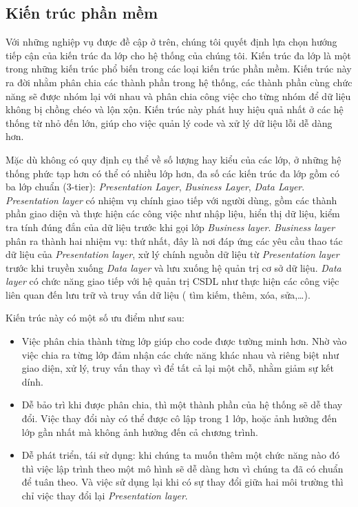 \subsection{Kiến trúc phần mềm}
Với những nghiệp vụ được đề cập ở trên, chúng tôi quyết định lựa chọn hướng tiếp cận của kiến trúc đa lớp cho hệ thống của chúng tôi. Kiến trúc đa lớp là một trong những kiến trúc phổ biến trong các loại kiến trúc phần mềm. Kiến trúc này ra đời nhằm phân chia các thành phần trong hệ thống, các thành phần cùng chức năng sẽ được nhóm lại với nhau và phân chia công việc cho từng nhóm để dữ liệu không bị chồng chéo và lộn xộn. Kiến trúc này phát huy hiệu quả nhất ở các hệ thống từ nhỏ đến lớn, giúp cho việc quản lý code và xử lý dữ liệu lỗi dễ dàng hơn.
\par
Mặc dù không có quy định cụ thể về số lượng hay kiểu của các lớp, ở những hệ thống phức tạp hơn có thể có nhiều lớp hơn, đa số các kiến trúc đa lớp gồm có ba lớp chuẩn (3-tier): \emph{Presentation Layer}, \emph{Business Layer}, \emph{Data Layer}. \emph{Presentation layer} có nhiệm vụ chính giao tiếp với người dùng, gồm các thành phần giao diện và thực hiện các công việc như nhập liệu, hiển thị dữ liệu, kiểm tra tính đúng đắn của dữ liệu trước khi gọi lớp \emph{Business layer}. \emph{Business layer} phân ra thành hai nhiệm vụ: thứ nhất, đây là nơi đáp ứng các yêu cầu thao tác dữ liệu của \emph{Presentation layer}, xử lý chính nguồn dữ liệu từ \emph{Presentation layer} trước khi truyền xuống \emph{Data layer} và lưu xuống hệ quản trị cơ sở dữ liệu. \emph{Data layer} có chức năng giao tiếp với hệ quản trị CSDL như thực hiện các công việc liên quan đến lưu trữ và truy vấn dữ liệu ( tìm kiếm, thêm, xóa, sửa,…).
\par
Kiến trúc này có một số ưu điểm như sau:
\begin{itemize}
    \item Việc phân chia thành từng lớp giúp cho code được tường minh hơn. Nhờ vào việc chia ra từng lớp đảm nhận các chức năng khác nhau và riêng biệt như giao diện, xử lý, truy vấn thay vì để tất cả lại một chỗ, nhằm giảm sự kết dính.
    \item Dễ bảo trì khi được phân chia, thì một thành phần của hệ thống sẽ dễ thay đổi. Việc thay đổi này có thể được cô lập trong 1 lớp, hoặc ảnh hưởng đến lớp gần nhất mà không ảnh hưởng đến cả chương trình.
    \item Dễ phát triển, tái sử dụng: khi chúng ta muốn thêm một chức năng nào đó thì việc lập trình theo một mô hình sẽ dễ dàng hơn vì chúng ta đã có chuẩn để tuân theo. Và việc sử dụng lại  khi có sự thay đổi giữa hai môi trường thì chỉ việc thay đổi lại \emph{Presentation layer}.
\end{itemize}

